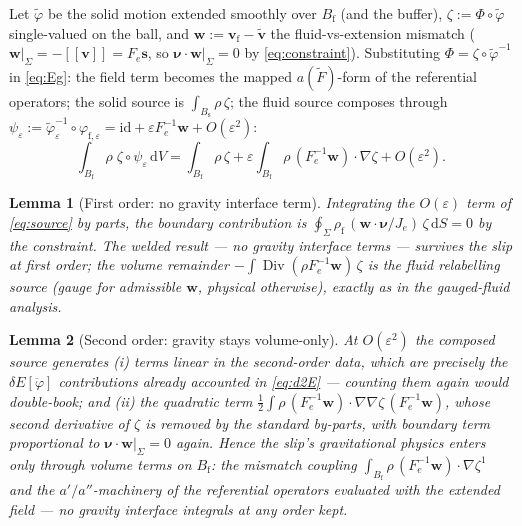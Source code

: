 \documentclass[11pt]{article}
\newtheorem{lemma}{Lemma}
\newcommand{\eps}{\varepsilon}
\newcommand{\Bs}{B_{\mathrm{s}}}
\newcommand{\Bf}{B_{\mathrm{f}}}
\newcommand{\bnu}{\bm{\nu}}
\newcommand{\bs}{\mathbf{s}}
\newcommand{\bv}{\mathbf{v}}
\newcommand{\bw}{\mathbf{w}}
\newcommand{\jump}[1]{[\![#1]\!]}
\newcommand{\dS}{\,\mathrm{d}S}
\newcommand{\dV}{\,\mathrm{d}V}
\newcommand{\Div}{\operatorname{Div}}
\begin{document}
Let $\tilde\varphi$ be the solid motion extended smoothly over $\Bf$
(and the buffer), $\zeta := \Phi\circ\tilde\varphi$ single-valued on
the ball, and $\bw := \bv_{\mathrm{f}} - \tilde{\bv}$ the
fluid-vs-extension mismatch ($\bw|_\Sigma = -\jump{\bv} = F_e\bs$, so
$\bnu\cdot\bw|_\Sigma = 0$ by \eqref{eq:constraint}). Substituting
$\Phi = \zeta\circ\tilde\varphi^{-1}$ in \eqref{eq:Eg}: the field term
becomes the mapped $a(\tilde F)$-form of the referential operators;
the solid source is
$\int_{\Bs}\rho\,\zeta$; the fluid source composes through
$\psi_\eps := \tilde\varphi_\eps^{-1}\circ\varphi_{\mathrm{f},\eps}
= \mathrm{id} + \eps F_e^{-1}\bw + O(\eps^2)$:
\begin{equation}
  \int_{\Bf} \rho\; \zeta\circ\psi_\eps \dV
  = \int_{\Bf} \rho\,\zeta
  + \eps \int_{\Bf} \rho\,(F_e^{-1}\bw)\cdot\nabla\zeta
  + O(\eps^2).
  \label{eq:source}
\end{equation}

\begin{lemma}[First order: no gravity interface term]\label{lem:noflux}
Integrating the $O(\eps)$ term of \eqref{eq:source} by parts, the
boundary contribution is
$\oint_\Sigma \rho_{\mathrm{f}}\,(\bw\cdot\bnu/J_e)\,\zeta \dS = 0$
by the constraint. The welded result --- no gravity interface terms
--- survives the slip at first order; the volume remainder
$-\int \Div(\rho F_e^{-1}\bw)\,\zeta$ is the fluid relabelling source
(gauge for admissible $\bw$, physical otherwise), exactly as in the
gauged-fluid analysis.
\end{lemma}

\begin{lemma}[Second order: gravity stays volume-only]\label{lem:vol}
At $O(\eps^2)$ the composed source generates (i) terms linear in the
second-order data, which are precisely the $\delta E[\ddot\varphi]$
contributions already accounted in \eqref{eq:d2E} --- counting them
again would double-book; and (ii) the quadratic term
$\tfrac12\int\rho\, (F_e^{-1}\bw)\cdot \nabla\nabla\zeta\,
(F_e^{-1}\bw)$, whose second derivative of $\zeta$ is removed by the
standard by-parts, with boundary term proportional to
$\bnu\cdot\bw|_\Sigma = 0$ again. Hence the slip's gravitational
physics enters \emph{only} through volume terms on $\Bf$: the mismatch
coupling $\int_{\Bf}\rho\,(F_e^{-1}\bw)\cdot\nabla\zeta^1$ and the
$a'/a''$-machinery of the referential operators evaluated with the
extended field --- no
gravity interface integrals at any order kept.
\end{lemma}
\end{document}
